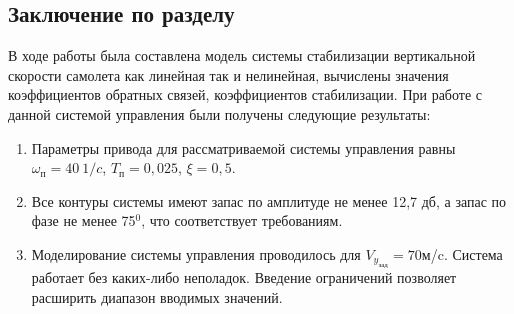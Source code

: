 \newpage
\begin{center}
    \subsection*{Заключение по разделу}
\end{center}

В ходе работы была составлена модель системы стабилизации вертикальной скорости самолета как линейная так и нелинейная, вычислены значения коэффициентов обратных связей, коэффициентов стабилизации. При работе с данной системой управления были получены следующие результаты:
\begin{enumerate}
    \item Параметры привода для рассматриваемой системы управления равны $\omega_\text{п} = 40 \ 1/c$, $T_\text{п} = 0,025$, $\xi = 0,5$.
    \item Все контуры системы имеют запас по амплитуде не менее 12,7 дб, а запас по фазе не менее 75$^0$, что соответствует требованиям.
    \item Моделирование системы управления проводилось для $V_y_{\text{зад}}= 70 $м/c. Система работает без каких-либо неполадок. Введение ограничений позволяет расширить диапазон вводимых значений.
\end{enumerate}


